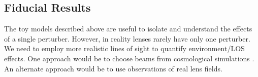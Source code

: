 \subsection{Fiducial Results}
The toy models described above are useful to isolate and understand the effects of a single perturber. However, in reality lenses rarely have only one perturber. We need to employ more realistic lines of sight to quantify environment/LOS effects. One approach would be to choose beams from cosmological simulations \citep[e.g.,][]{Hilbert09, Collett13, Jaroszynski12, Jaroszynski14}. An alternate approach would be to use observations of real lens fields.